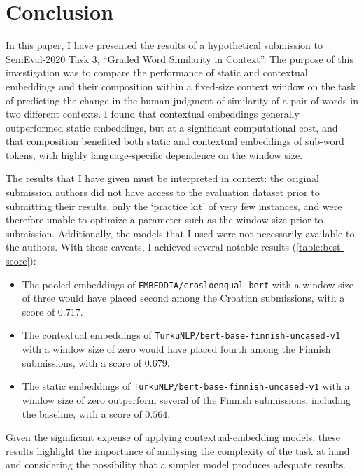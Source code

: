 \section{Conclusion}
\label{sec:conclusion}

In this paper, I have presented the results of a hypothetical submission to
SemEval-2020 Task 3, ``Graded Word Similarity in Context''.
The purpose of this investigation was to compare the performance of static and
contextual embeddings and their composition within a fixed-size context window on the
task of predicting the change in the human judgment of similarity of a pair of words in
two different contexts.
I found that contextual embeddings generally outperformed static embeddings, but at a
significant computational cost, and that composition benefited both static and
contextual embeddings of sub-word tokens, with highly language-specific dependence on
the window size.

The results that I have given must be interpreted in context: the original submission
authors did not have access to the evaluation dataset prior to submitting their
results, only the `practice kit' of very few instances, and were therefore unable to
optimize a parameter such as the window size prior to submission.
Additionally, the models that I used were not necessarily available to the authors.
With these caveats, I achieved several notable results (\cref{table:best-score}):
\begin{itemize}
  \item The pooled embeddings of \texttt{EMBEDDIA/crosloengual-bert} with a window
        size of three would have placed second among the Croatian submissions, with a
        score of $0.717$.
  \item The contextual embeddings of \texttt{TurkuNLP/bert-base-finnish-uncased-v1}
        with a window size of zero would have placed fourth among the Finnish
        submissions, with a score of $0.679$.
  \item The static embeddings of \texttt{TurkuNLP/bert-base-finnish-uncased-v1}
        with a window size of zero outperform several of the Finnish submissions,
        including the baseline, with a score of $0.564$.
\end{itemize}
Given the significant expense of applying contextual-embedding models, these results
highlight the importance of analysing the complexity of the task at hand and
considering the possibility that a simpler model produces adequate results.
